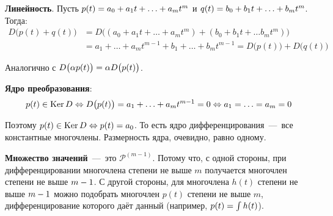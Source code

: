 \documentclass[a4paper,12pt]{article}
\begin{document}
  \begin{solution}
    \textbf{Линейность}. Пусть $p(t) \hm= a_0 \hm+ a_1 t \hm+ \ldots \hm+ a_m t^m$ и $q(t) \hm= b_0 \hm+ b_1 t \hm+ \ldots \hm+ b_m t^m$.
    Тогда:
    \begin{equation*}
    \begin{split}
      D\bigl(p(t) + q(t)\bigr) &= D\bigl((a_0 + a_1 t + \ldots + a_m t^m) + (b_0 + b_1 t + \ldots b_m t^m)\bigr)\\
      &= a_1 + \ldots + a_m t^{m - 1} + b_1 + \ldots + b_m t^{m - 1}
      = D\bigl(p(t)\bigr) + D\bigl(q(t)\bigr)
    \end{split}
    \end{equation*}
    
    Аналогично с $D\bigl(\alpha p(t)\bigr) \hm= \alpha D\bigl(p(t)\bigr)$.
    
    \medskip
    
    \textbf{Ядро преобразования}:
    \[
      p(t) \in \operatorname{Ker} D \Leftrightarrow D\bigl(p(t)\bigr) = a_1 + \ldots + a_m t^{m - 1} = 0 \Leftrightarrow a_1 = \ldots = a_m = 0
    \]
    
    Поэтому $p(t) \in \Ker D \hm\Leftrightarrow p(t) \hm= a_0$.
    То есть ядро дифференцирования~---~все константные многочлены.
    Размерность ядра, очевидно, равно одному.
    
    \medskip
    
    \textbf{Множество значений}~---~это $\mathcal P^{(m - 1)}$.
    Потому что, с одной стороны, при дифференцировании многочлена степени не выше $m$ получается многочлен степени не выше $m \hm- 1$.
    С другой стороны, для многочлена $h(t)$ степени не выше $m \hm- 1$ можно подобрать многочлен $p(t)$ степени не выше $m$, дифференцирование которого даёт данный (например, $p(t) \hm= \int h(t)$).
    
    \medskip
    

\end{solution}
\end{document}
